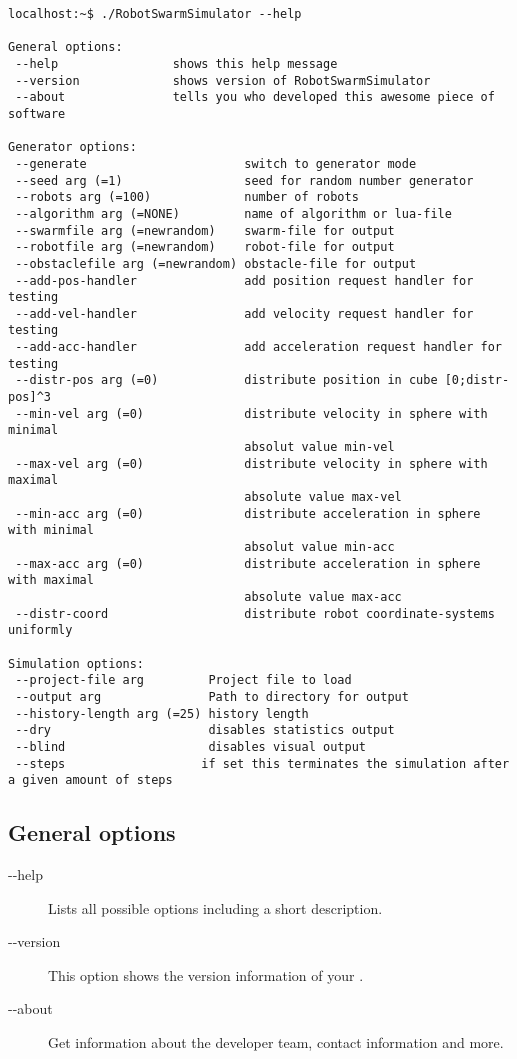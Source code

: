 \documentclass[a4paper,halfparskip,11pt,twoside]{scrartcl}
\begin{document}
\begin{lstlisting}[caption={\RSS Helpline},label=lst:RSS-help]
localhost:~$ ./RobotSwarmSimulator --help

General options:
 --help                shows this help message
 --version             shows version of RobotSwarmSimulator
 --about               tells you who developed this awesome piece of software

Generator options:
 --generate                      switch to generator mode
 --seed arg (=1)                 seed for random number generator
 --robots arg (=100)             number of robots
 --algorithm arg (=NONE)         name of algorithm or lua-file
 --swarmfile arg (=newrandom)    swarm-file for output
 --robotfile arg (=newrandom)    robot-file for output
 --obstaclefile arg (=newrandom) obstacle-file for output
 --add-pos-handler               add position request handler for testing
 --add-vel-handler               add velocity request handler for testing
 --add-acc-handler               add acceleration request handler for testing
 --distr-pos arg (=0)            distribute position in cube [0;distr-pos]^3
 --min-vel arg (=0)              distribute velocity in sphere with minimal  
                                 absolut value min-vel
 --max-vel arg (=0)              distribute velocity in sphere with maximal
                                 absolute value max-vel
 --min-acc arg (=0)              distribute acceleration in sphere with minimal  
                                 absolut value min-acc
 --max-acc arg (=0)              distribute acceleration in sphere with maximal
                                 absolute value max-acc
 --distr-coord                   distribute robot coordinate-systems uniformly

Simulation options:
 --project-file arg         Project file to load
 --output arg               Path to directory for output
 --history-length arg (=25) history length
 --dry                      disables statistics output
 --blind                    disables visual output
 --steps                   if set this terminates the simulation after a given amount of steps
\end{lstlisting}


\subsection{General options}
\begin{description}
	\item [-{}-help] Lists all possible options including a short description.
	\item [-{}-version] This option shows the version information of your \RSS.
	\item [-{}-about] Get information about the developer team, contact information and more.
\end{description}
\end{document}
